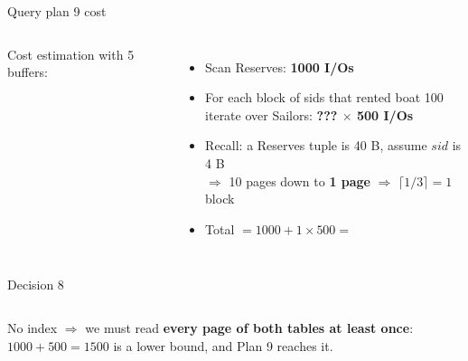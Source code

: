 \begin{frame}{Query plan 9 cost }
  \begin{columns}[c]
      Cost estimation with 5 buffers:
      \begin{itemize}
        \item Scan Reserves: \textbf{1000 I/Os}
        \item For each block of sids that rented boat 100\\ iterate over Sailors: \textbf{??? $\times$ 500 I/Os}
        \item Recall: a Reserves tuple is 40 B, assume $\mathit{sid}$ is 4 B\\
              $\Rightarrow$ 10 pages down to \textbf{1 page} $\Rightarrow$ $\lceil 1/3 \rceil = 1$ block
        \item Total $= 1000 + 1 \times 500 =$ 
      \end{itemize}
      \planbox[hl]{60mm}{\PlanNine}
  \end{columns}
\end{frame}

\begin{frame}{Decision 8 }
  \begin{columns}[T]
      \planbox[small]{37mm}{\PlanEight}\centering{}
      \centering\vspace*{17mm}{\color{vinuRed}\Large\faArrowRight}
      \planbox[small,hl]{37mm}{\PlanNine}\centering{}
  \end{columns}
  \vspace{-1mm}
  \begin{extrabox}
    \footnotesize No index $\Rightarrow$ we must read \textbf{every page of both tables at least once}:
    $1000 + 500 = 1500$ is a lower bound, and Plan 9 reaches it.
  \end{extrabox}
\end{frame}


